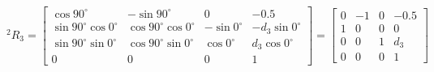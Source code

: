 \documentclass{ctexart}
\begin{document}
\begin{itemize}
\begin{equation}
		^2R_3=\begin{bmatrix}
			\cos90^\circ & -\sin90^\circ & 0 & -0.5 \\
			\sin90^\circ \cos0^\circ & \cos90^\circ \cos0^\circ & -\sin0^\circ & -d_3\sin0^\circ \\
			\sin90^\circ \sin0^\circ & \cos90^\circ \sin0^\circ & \cos0^\circ & d_3\cos0^\circ \\
			0 & 0 & 0 & 1
		\end{bmatrix}=\begin{bmatrix}
			0 & -1 & 0 & -0.5 \\
			1 & 0 & 0 & 0\\
			0 & 0 & 1 & d_3 \\
			0 & 0 & 0 & 1
		\end{bmatrix}
	\end{equation}

\end{itemize}
\end{document}
